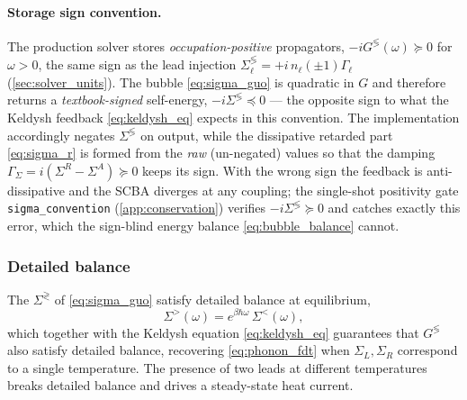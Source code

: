 \paragraph{Storage sign convention.}
The production solver stores \emph{occupation-positive} propagators,
$-iG^{\lessgtr}(\omega)\succeq0$ for $\omega>0$, the same sign as the lead
injection $\Sigma_\ell^{\lessgtr}=+i\,n_\ell(\pm1)\Gamma_\ell$
(\cref{sec:solver_units}). The bubble \cref{eq:sigma_guo} is quadratic in $G$
and therefore returns a \emph{textbook-signed} self-energy,
$-i\Sigma^{\lessgtr}\preceq0$ --- the opposite sign to what the Keldysh feedback
\cref{eq:keldysh_eq} expects in this convention. The implementation accordingly
negates $\Sigma^{\lessgtr}$ on output, while the dissipative retarded part
\cref{eq:sigma_r} is formed from the \emph{raw} (un-negated) values so that the
damping $\Gamma_\Sigma=i(\Sigma^R-\Sigma^A)\succeq0$ keeps its sign. With the
wrong sign the feedback is anti-dissipative and the SCBA diverges at any
coupling; the single-shot positivity gate \texttt{sigma\_convention}
(\cref{app:conservation}) verifies $-i\Sigma^{\lessgtr}\succeq0$ and catches
exactly this error, which the sign-blind energy balance \cref{eq:bubble_balance}
cannot.

\subsubsection{Detailed balance}

The $\Sigma^{\gtrless}$ of \cref{eq:sigma_guo} satisfy detailed balance
at equilibrium,
\begin{equation}\label{eq:detailed_balance}
  \Sigma^>(\omega) = e^{\beta\hbar\omega}\,\Sigma^<(\omega),
\end{equation}
which together with the Keldysh equation \cref{eq:keldysh_eq}
guarantees that $G^{\lessgtr}$ also satisfy detailed balance, recovering
\cref{eq:phonon_fdt} when $\Sigma_L,\Sigma_R$ correspond to a single
temperature. The presence of two leads at different temperatures breaks
detailed balance and drives a steady-state heat current.

